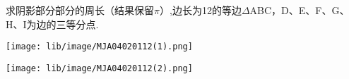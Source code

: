 求阴影部分部分的周长（结果保留$\pi$）,边长为12的等边$\Delta$ABC，D、E、F、G、H、I为边的三等分点.

\begin{center}

    \texttt{[image: lib/image/MJA04020112(1).png]}\qquad\qquad\qquad

    \texttt{[image: lib/image/MJA04020112(2).png]}

\end{center}



